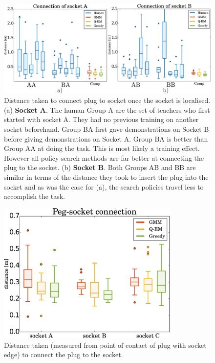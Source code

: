 \begin{figure}
 \centering
   \includegraphics[width=\textwidth]{./ch4-PiH/Figures/Results2/real_exp_socketAB.pdf}
  \caption{Distance taken to connect plug to socket once the socket is localised. (a) \textbf{Socket A}. The human 
  Group A are the set of teachers who first started with socket A. They had no previous training on another socket beforehand. Group 
  BA first gave demonstrations on Socket B before giving demonstrations on Socket A. Group BA
  is better than Group AA at doing the task. This is most likely a training effect. However all policy search methods are far better
  at connecting the plug to the socket. (b) \textbf{Socket B}. Both Groups AB and BB are similar in terms 
  of the distance they took to insert the plug into the socket and as was the case for (a), the search policies travel less to accomplish 
  the task.   } 
  \label{fig:real_statistics}
\end{figure}

\begin{figure}
 \centering
   \includegraphics[width=0.8\textwidth]{./ch4-PiH/Figures/Results2/peg_socket_connection_v2.pdf}
   \caption{Distance taken (measured from point of contact of plug with socket edge) to connect the plug to the socket.}
  \label{fig:real_statistics2}
\end{figure}

